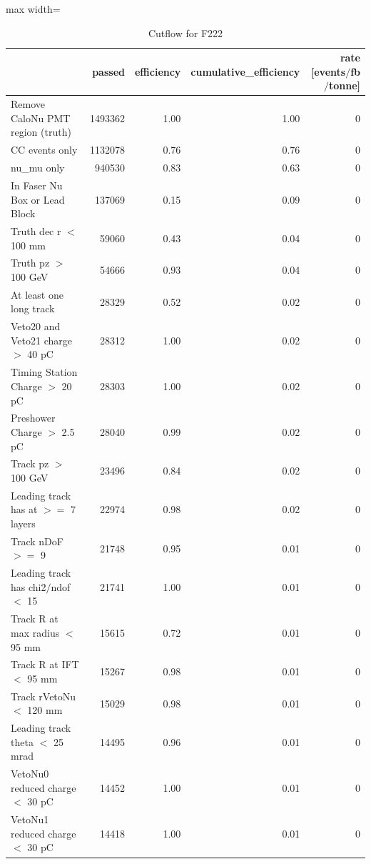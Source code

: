 \documentclass{article}
\begin{document}
\begin{table}
\centering
\caption{Cutflow for F222}
\begin{adjustbox}{max width=\textwidth}
\begin{tabular}{lrrrr}
\toprule
 & passed & efficiency & cumulative\_efficiency & rate [events$/$fb$/$tonne] \\
\midrule
Remove CaloNu PMT region (truth) & 1493362 & 1.00 & 1.00 & 0 \\
CC events only & 1132078 & 0.76 & 0.76 & 0 \\
nu\_mu only & 940530 & 0.83 & 0.63 & 0 \\
In Faser Nu Box or Lead Block & 137069 & 0.15 & 0.09 & 0 \\
Truth dec r $<$ 100 mm & 59060 & 0.43 & 0.04 & 0 \\
Truth pz $>$ 100 GeV & 54666 & 0.93 & 0.04 & 0 \\
At least one long track & 28329 & 0.52 & 0.02 & 0 \\
Veto20 and Veto21 charge $>$ 40 pC & 28312 & 1.00 & 0.02 & 0 \\
Timing Station Charge $>$ 20 pC & 28303 & 1.00 & 0.02 & 0 \\
Preshower Charge $>$ 2.5 pC & 28040 & 0.99 & 0.02 & 0 \\
Track pz $>$ 100 GeV & 23496 & 0.84 & 0.02 & 0 \\
Leading track has at $>$$=$ 7 layers & 22974 & 0.98 & 0.02 & 0 \\
Track nDoF $>$$=$ 9 & 21748 & 0.95 & 0.01 & 0 \\
Leading track has chi2$/$ndof $<$ 15 & 21741 & 1.00 & 0.01 & 0 \\
Track R at max radius $<$ 95 mm & 15615 & 0.72 & 0.01 & 0 \\
Track R at IFT $<$ 95 mm & 15267 & 0.98 & 0.01 & 0 \\
Track rVetoNu $<$ 120 mm & 15029 & 0.98 & 0.01 & 0 \\
Leading track theta $<$ 25 mrad & 14495 & 0.96 & 0.01 & 0 \\
VetoNu0 reduced charge $<$ 30 pC & 14452 & 1.00 & 0.01 & 0 \\
VetoNu1 reduced charge $<$ 30 pC & 14418 & 1.00 & 0.01 & 0 \\
\bottomrule
\end{tabular}

\end{adjustbox}
\end{table}
\end{document}
